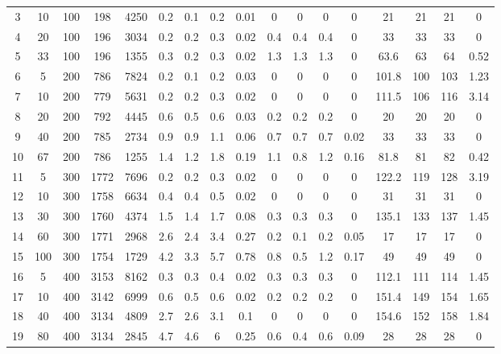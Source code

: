 \documentclass[11pt]{article}
\begin{document}
\begin{appendices}
\begin{landscape}
\begin{longtable}[c]{ccccc|cccc|cccc|cccc}
				\rowcolor[HTML]{EFEFEF} 
				3 & 10 & 100 & 198 & 4250 & 0.2 & 0.1 & 0.2 & 0.01 & 0 & 0 & 0 & 0 & 21 & 21 & 21 & 0 \\
				\rowcolor[HTML]{EFEFEF} 
				4 & 20 & 100 & 196 & 3034 & 0.2 & 0.2 & 0.3 & 0.02 & 0.4 & 0.4 & 0.4 & 0 & 33 & 33 & 33 & 0 \\
				\rowcolor[HTML]{EFEFEF} 
				5 & 33 & 100 & 196 & 1355 & 0.3 & 0.2 & 0.3 & 0.02 & 1.3 & 1.3 & 1.3 & 0 & 63.6 & 63 & 64 & 0.52 \\
				6 & 5 & 200 & 786 & 7824 & 0.2 & 0.1 & 0.2 & 0.03 & 0 & 0 & 0 & 0 & 101.8 & 100 & 103 & 1.23 \\
				7 & 10 & 200 & 779 & 5631 & 0.2 & 0.2 & 0.3 & 0.02 & 0 & 0 & 0 & 0 & 111.5 & 106 & 116 & 3.14 \\
				8 & 20 & 200 & 792 & 4445 & 0.6 & 0.5 & 0.6 & 0.03 & 0.2 & 0.2 & 0.2 & 0 & 20 & 20 & 20 & 0 \\
				9 & 40 & 200 & 785 & 2734 & 0.9 & 0.9 & 1.1 & 0.06 & 0.7 & 0.7 & 0.7 & 0.02 & 33 & 33 & 33 & 0 \\
				10 & 67 & 200 & 786 & 1255 & 1.4 & 1.2 & 1.8 & 0.19 & 1.1 & 0.8 & 1.2 & 0.16 & 81.8 & 81 & 82 & 0.42 \\
				\rowcolor[HTML]{EFEFEF} 
				11 & 5 & 300 & 1772 & 7696 & 0.2 & 0.2 & 0.3 & 0.02 & 0 & 0 & 0 & 0 & 122.2 & 119 & 128 & 3.19 \\
				\rowcolor[HTML]{EFEFEF} 
				12 & 10 & 300 & 1758 & 6634 & 0.4 & 0.4 & 0.5 & 0.02 & 0 & 0 & 0 & 0 & 31 & 31 & 31 & 0 \\
				\rowcolor[HTML]{EFEFEF} 
				13 & 30 & 300 & 1760 & 4374 & 1.5 & 1.4 & 1.7 & 0.08 & 0.3 & 0.3 & 0.3 & 0 & 135.1 & 133 & 137 & 1.45 \\
				\rowcolor[HTML]{EFEFEF} 
				14 & 60 & 300 & 1771 & 2968 & 2.6 & 2.4 & 3.4 & 0.27 & 0.2 & 0.1 & 0.2 & 0.05 & 17 & 17 & 17 & 0 \\
				\rowcolor[HTML]{EFEFEF} 
				15 & 100 & 300 & 1754 & 1729 & 4.2 & 3.3 & 5.7 & 0.78 & 0.8 & 0.5 & 1.2 & 0.17 & 49 & 49 & 49 & 0 \\
				16 & 5 & 400 & 3153 & 8162 & 0.3 & 0.3 & 0.4 & 0.02 & 0.3 & 0.3 & 0.3 & 0 & 112.1 & 111 & 114 & 1.45 \\
				17 & 10 & 400 & 3142 & 6999 & 0.6 & 0.5 & 0.6 & 0.02 & 0.2 & 0.2 & 0.2 & 0 & 151.4 & 149 & 154 & 1.65 \\
				18 & 40 & 400 & 3134 & 4809 & 2.7 & 2.6 & 3.1 & 0.1 & 0 & 0 & 0 & 0 & 154.6 & 152 & 158 & 1.84 \\
				19 & 80 & 400 & 3134 & 2845 & 4.7 & 4.6 & 6 & 0.25 & 0.6 & 0.4 & 0.6 & 0.09 & 28 & 28 & 28 & 0 \\

\end{longtable}
\end{landscape}
\end{appendices}
\end{document}
